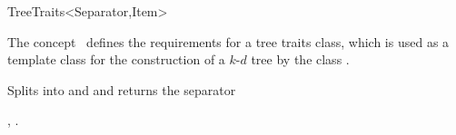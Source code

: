 

\begin{ccRefConcept}{TreeTraits<Separator,Item>}

\ccDefinition
  
The concept \ccRefName\ defines the requirements for a tree traits class, which is used as
a template class for the construction of a $k$-$d$  tree by the class .

\ccCreation
{}  %



{Splits  into  and  and returns the separator}
 
\ccHasModels


\ccSeeAlso

,
.

\end{ccRefConcept}



